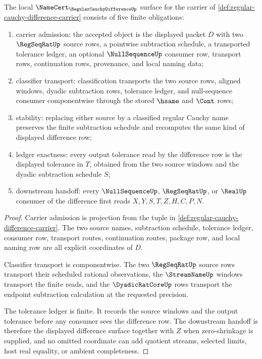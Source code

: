 \begin{theorem}
\label{thm:regular-cauchy-difference-namecert-obligations}
The local $\NameCert_{\RegularCauchyDifferenceUp}$ surface for the carrier of \autoref{def:regular-cauchy-difference-carrier} consists of five finite obligations:
\begin{enumerate}
\item carrier admission: the accepted object is the displayed packet $D$ with two $\RegSeqRatUp$ source rows, a pointwise subtraction schedule, a transported tolerance ledger, an optional $\NullSequenceUp$ consumer row, transport rows, continuation rows, provenance, and local naming data;
\item classifier transport: classification transports the two source rows, aligned windows, dyadic subtraction rows, tolerance ledger, and null-sequence consumer componentwise through the stored $\hsame$ and $\Cont$ rows;
\item stability: replacing either source by a classified regular Cauchy name preserves the finite subtraction schedule and recomputes the same kind of displayed difference row;
\item ledger exactness: every output tolerance read by the difference row is the displayed tolerance in $T$, obtained from the two source windows and the dyadic subtraction schedule $S$;
\item downstream handoff: every $\NullSequenceUp$, $\RegSeqRatUp$, or $\RealUp$ consumer of the difference first reads $X,Y,S,T,Z,H,C,P,N$.
\end{enumerate}
\end{theorem}
\begin{proof}
Carrier admission is projection from the tuple in \autoref{def:regular-cauchy-difference-carrier}. The two source names, subtraction schedule, tolerance ledger, consumer row, transport routes, continuation routes, package row, and local naming row are all explicit coordinates of $D$.

Classifier transport is componentwise. The two $\RegSeqRatUp$ source rows transport their scheduled rational observations, the $\StreamNameUp$ windows transport the finite reads, and the $\DyadicRatCoreUp$ rows transport the endpoint subtraction calculation at the requested precision.

The tolerance ledger is finite. It records the source windows and the output tolerance before any consumer sees the difference row. The downstream handoff is therefore the displayed difference surface together with $Z$ when zero-shrinkage is supplied, and no omitted coordinate can add quotient streams, selected limits, host real equality, or ambient completeness.
\end{proof}

